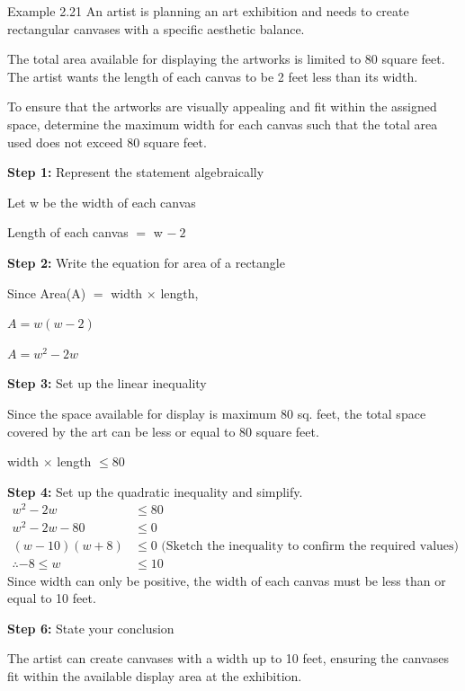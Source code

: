 \begin{example}{Example 2.21}
An artist is planning an art exhibition and needs to create rectangular canvases
with a specific aesthetic balance.

The total area available for displaying the artworks is limited to 80 square feet.
The artist wants the length of each canvas to be 2 feet less than its width.

To ensure that the artworks are visually appealing and fit within the assigned
space, determine the maximum width for each canvas such that the total area used
does not exceed 80 square feet.

\solution
\textbf{Step 1:} Represent the statement algebraically

Let w be the width of each canvas

Length of each canvas $=$ w $-\ 2$

\textbf{Step 2:} Write the equation for area of a rectangle

Since Area(A) $=$ width $\times$ length,

$A = w(w - 2)$

$A = w^2 - 2w$

\textbf{Step 3:} Set up the linear inequality

Since the space available for display is maximum 80 sq. feet, the total space
covered by the art can be less or equal to 80 square feet.

width $\times$ length $\le 80$

\textbf{Step 4:} Set up the quadratic inequality and simplify.
\begin{align*}
  w^2 - 2w &\le 80 \\
  w^2 - 2w - 80 &\le 0 \\
  (w - 10)(w + 8) &\le 0 \text{ (Sketch the inequality to confirm the required values)} \\
  \therefore -8 \le w &\le 10
\end{align*}
Since width can only be positive, the width of each canvas must be less than or
equal to 10 feet.

\textbf{Step 6:} State your conclusion

The artist can create canvases with a width up to 10 feet, ensuring the canvases fit
within the available display area at the exhibition.
\end{example}

